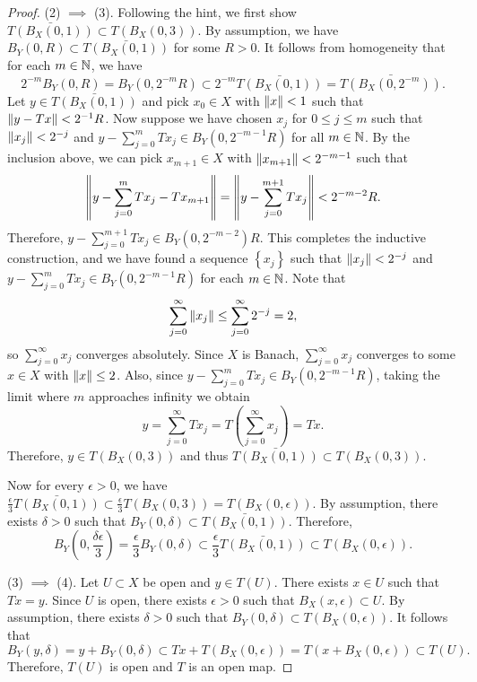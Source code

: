 \documentclass[a4paper]{article}
\begin{document}
\begin{proof}
  (2) $\implies$ (3). Following the hint, we first show
  $\bar{T(B_X(0, 1))} \subset T(B_X(0, 3))$.
  By assumption, we have
  $B_Y(0, R) \subset \bar{T(B_X(0, 1))}$ for some $R > 0$.
  It follows from homogeneity that for each $m \in \mathbb{N}$, we have
  \[
    2^{-m} B_Y(0, R) = B_Y(0, 2^{-m} R) \subset
    2^{-m} \bar{T(B_X(0, 1))} = \bar{T(B_X(0, 2^{-m}))}.
  \]
  Let
  $y \in \bar{T(B_X(0, 1))}$ and pick $x_0 \in X$ with
  $\left\lVert x\right\rVert < 1$ such that $\left\lVert y - Tx\right\rVert < 2^{-1} R$. Now
  suppose we have chosen $x_j$ for $0 \leq j \leq m$ such that
  $\left\lVert x_j\right\rVert < 2^{-j}$ and $y - \sum_{j=0}^m T x_j \in B_Y(0,
  2^{-m - 1} R) $ for all $m \in \mathbb{N}$. By the inclusion above,
  we can pick $x_{m+1} \in X$ with $\left\lVert x_{m+1}\right\rVert
  < 2^{-m-1}$ such that
  \[
  \left\lVert y - \sum_{j=0}^m T x_j - T x_{m+1}\right\rVert
  = \left\lVert y - \sum_{j=0}^{m+1} T x_j\right\rVert < 2^{-m-2} R.
  \]
  Therefore, $y - \sum_{j=0}^{m+1} T x_j \in B_Y(0, 2^{-m-2}) R$.
  This completes the inductive construction, and we have
  found a sequence $\left\{ x_j \right\}$ such that
  $\left\lVert x_j\right\rVert < 2^{-j}$ and
  $y - \sum_{j=0}^m T x_j \in B_Y (0, 2^{-m-1} R)$
  for each $m \in \mathbb{N}$. Note that
  \[
  \sum_{j=0}^\infty \left\lVert x_j\right\rVert \leq \sum_{j=0}^{\infty} 2^{-j}
  = 2,
  \]
  so $\sum_{j=0}^\infty x_j$ converges absolutely. Since $X$
  is Banach, $\sum_{j=0}^\infty x_j$ converges
  to some $x \in X$ with $\left\lVert x\right\rVert \leq 2$. Also, since
  $y - \sum_{j=0}^m T x_j \in B_Y(0, 2^{-m-1}R)$, taking the
  limit where $m$ approaches infinity we obtain
  \[
  y = \sum_{j=0}^\infty T x_j = T \left( \sum_{j=0}^\infty x_j \right)
  = T x.
  \]
  Therefore, $y \in T(B_X(0, 3))$ and thus $\bar{T(B_X(0, 1))}
  \subset T(B_X (0,3))$.

  Now for every $\epsilon > 0$, we have
  $\frac{\epsilon}{3} \bar{T(B_X(0, 1))} \subset \frac{\epsilon}{3}
  T(B_X(0, 3)) = T(B_X(0, \epsilon))$. By assumption, there exists
  $\delta > 0$ such that $B_Y(0, \delta) \subset \bar{T(B_X(0, 1))}$.
  Therefore,
  \[
  B_Y \left( 0, \frac{\delta \epsilon}{3} \right) = \frac{\epsilon}{3}
  B_Y(0, \delta) \subset \frac{\epsilon}{3} \bar{T(B_X(0, 1))}
  \subset T(B_X(0, \epsilon)).
  \]

  (3) $\implies$ (4). Let $U \subset X$ be open and $y \in T(U)$.
  There exists $x \in U$ such that $T x = y$. Since $U$ is open,
  there exists $\epsilon > 0$ such that $B_X(x, \epsilon)
  \subset U$. By assumption, there exists $\delta > 0$
  such that $B_Y(0, \delta) \subset T(B_X(0, \epsilon))$.
  It follows that
  \[
  B_Y(y, \delta) = y + B_Y(0, \delta) \subset Tx + T(B_X(0, \epsilon))
  = T(x + B_X(0, \epsilon)) \subset T(U).
  \]
  Therefore, $T(U)$ is open and $T$ is an open map.


\end{proof}
\end{document}
